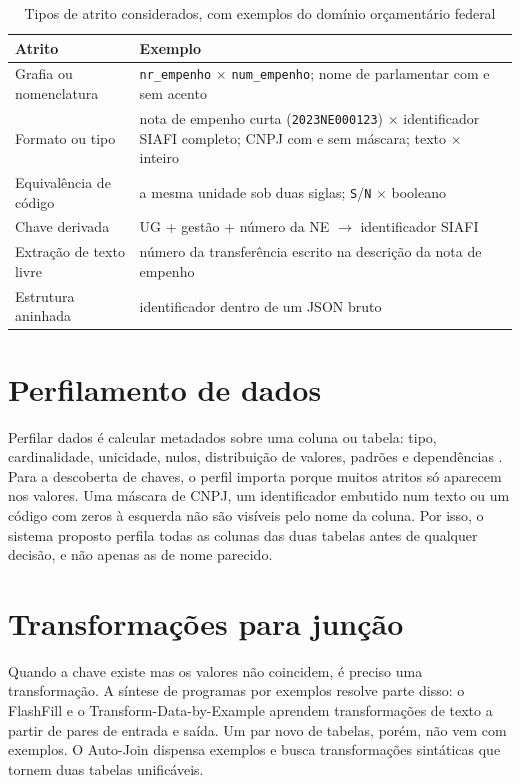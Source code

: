 \begin{table}[htbp]
\centering
\caption{Tipos de atrito considerados, com exemplos do domínio orçamentário
federal}
\label{tab:atritos}
\footnotesize
\begin{tabularx}{\textwidth}{@{}l>{\raggedright\arraybackslash}X@{}}
\toprule
\textbf{Atrito} & \textbf{Exemplo} \\
\midrule
Grafia ou nomenclatura & \texttt{nr\_empenho} $\times$ \texttt{num\_empenho}; nome de parlamentar com e sem acento \\
Formato ou tipo & nota de empenho curta (\texttt{2023NE000123}) $\times$ identificador SIAFI completo; CNPJ com e sem máscara; texto $\times$ inteiro \\
Equivalência de código & a mesma unidade sob duas siglas; \texttt{S}/\texttt{N} $\times$ booleano \\
Chave derivada & UG + gestão + número da NE $\rightarrow$ identificador SIAFI \\
Extração de texto livre & número da transferência escrito na descrição da nota de empenho \\
Estrutura aninhada & identificador dentro de um JSON bruto \\
\bottomrule
\end{tabularx}
\end{table}

\section{Perfilamento de dados}
\label{sec:fundamentacao-perfilamento-de-dados-e-evidencias-de-compatibilidade}

Perfilar dados é calcular metadados sobre uma coluna ou tabela: tipo,
cardinalidade, unicidade, nulos, distribuição de valores, padrões e
dependências \cite{abedjan2015profiling}. Para a descoberta de chaves, o
perfil importa porque muitos atritos só aparecem nos valores. Uma máscara de
CNPJ, um identificador embutido num texto ou um código com zeros à esquerda
não são visíveis pelo nome da coluna. Por isso, o sistema proposto perfila
todas as colunas das duas tabelas antes de qualquer decisão, e não apenas as
de nome parecido.

\section{Transformações para junção}
\label{sec:fundamentacao-transformacoes-para-juncao}

Quando a chave existe mas os valores não coincidem, é preciso uma
transformação. A síntese de programas por exemplos resolve parte disso: o
FlashFill \cite{gulwani2011flashfill} e o Transform-Data-by-Example
\cite{he2018tde} aprendem transformações de texto a partir de pares de
entrada e saída. Um par novo de tabelas, porém, não vem com exemplos. O
Auto-Join \cite{zhu2017autojoin} dispensa exemplos e busca transformações
sintáticas que tornem duas tabelas unificáveis.

